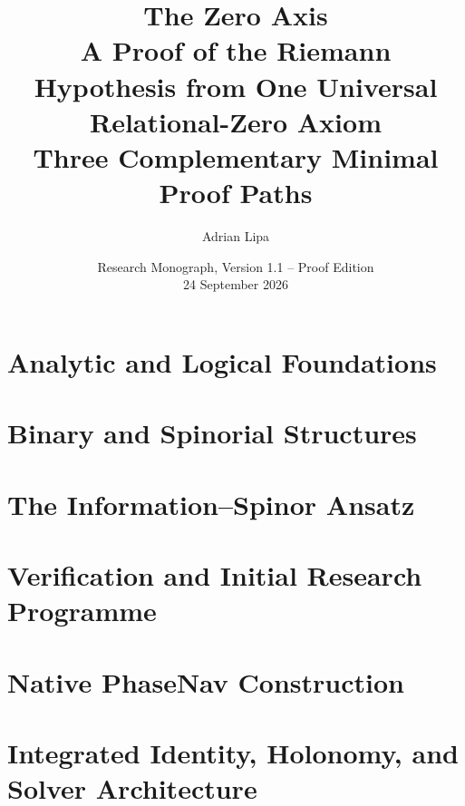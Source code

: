 \documentclass[11pt,a4paper,openany]{book}
\title{\textbf{The Zero Axis}\\[0.5em]
\Large A Proof of the Riemann Hypothesis from One Universal Relational-Zero Axiom\\
\large Three Complementary Minimal Proof Paths}
\author{Adrian Lipa}
\date{Research Monograph, Version 1.1 -- Proof Edition\\24 September 2026}
\theoremstyle{definition}
\theoremstyle{remark}
\begin{document}
\frontmatter




\tableofcontents
\listoffigures
\listoftables

\mainmatter
\part{Analytic and Logical Foundations}




\part{Binary and Spinorial Structures}





\part{The Information--Spinor Ansatz}






\part{Verification and Initial Research Programme}




\part{Native PhaseNav Construction}







\part{Integrated Identity, Holonomy, and Solver Architecture}



\end{document}
